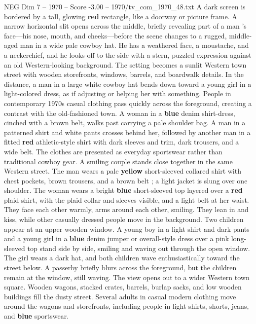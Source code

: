 \begin{textsample}{NEG Dim 7 – 1970 – Score -3.00 – 1970/tv\_com\_1970\_48.txt}  \label{ex:f7_neg_064}
A dark screen is bordered by a tall, glowing \textbf{red} rectangle, like a doorway or picture frame.
A narrow horizontal slit opens across the middle, briefly revealing part of a man ’s face—his nose, mouth, and cheeks—before the scene changes to a rugged, middle-aged man in a wide pale cowboy hat.
He has a weathered face, a moustache, and a neckerchief, and he looks off to the side with a stern, puzzled expression against an old Western-looking background.
The setting becomes a sunlit Western town street with wooden storefronts, windows, barrels, and boardwalk details.
In the distance, a man in a large white cowboy hat bends down toward a young girl in a light-colored dress, as if adjusting or helping her with something.
People in contemporary 1970s casual clothing pass quickly across the foreground, creating a contrast with the old-fashioned town.
A woman in a \textbf{blue} denim shirt-dress, cinched with a brown belt, walks past carrying a pale shoulder bag.
A man in a patterned shirt and white pants crosses behind her, followed by another man in a fitted \textbf{red} athletic-style shirt with dark sleeves and trim, dark trousers, and a wide belt.
The clothes are presented as everyday sportswear rather than traditional cowboy gear.
A smiling couple stands close together in the same Western street.
The man wears a pale \textbf{yellow} short-sleeved collared shirt with chest pockets, brown trousers, and a brown belt ; a light jacket is slung over one shoulder.
The woman wears a bright \textbf{blue} short-sleeved top layered over a \textbf{red} plaid shirt, with the plaid collar and sleeves visible, and a light belt at her waist.
They face each other warmly, arms around each other, smiling.
They lean in and kiss, while other casually dressed people move in the background.
Two children appear at an upper wooden window.
A young boy in a light shirt and dark pants and a young girl in a \textbf{blue} denim jumper or overall-style dress over a pink long-sleeved top stand side by side, smiling and waving out through the open window.
The girl wears a dark hat, and both children wave enthusiastically toward the street below.
A passerby briefly blurs across the foreground, but the children remain at the window, still waving.
The view opens out to a wider Western town square.
Wooden wagons, stacked crates, barrels, burlap sacks, and low wooden buildings fill the dusty street.
Several adults in casual modern clothing move around the wagons and storefronts, including people in light shirts, shorts, jeans, and \textbf{blue} sportswear.

\end{textsample}
